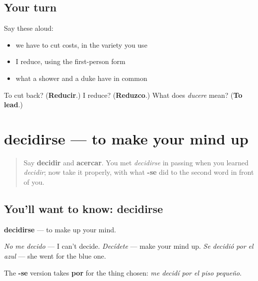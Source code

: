 \subsection*{Your turn}
Say these aloud:

\begin{itemize}
\raggedright
  \item we have to cut costs, in the variety you use
  \item I reduce, using the first-person form
  \item what a shower and a duke have in common
\end{itemize}

\begin{tcolorbox}[breakable,colback=teal!4,colframe=teal!35!black,title={Before you move on}]
To cut back? (\textbf{Reducir}.) I reduce? (\textbf{Reduzco}.) What does \emph{ducere} mean? (\textbf{To lead}.)
\end{tcolorbox}
\section[decidirse]{decidirse — to make your mind up}

\label{lesson:ES-C462-decidirse}



\begin{quote}
Say \textbf{decidir} and \textbf{acercar}. You met \emph{decidirse} in passing when you learned \emph{decidir}; now take it properly, with what \textbf{-se} did to the second word in front of you.
\end{quote}

\subsection*{You'll want to know: decidirse}
\textbf{decidirse} — to make up your mind.

\emph{No me decido} — I can't decide. \emph{Decídete} — make your mind up. \emph{Se decidió por el azul} — she went for the blue one.

The \textbf{-se} version takes \textbf{por} for the thing chosen: \emph{me decidí por el piso pequeño}.

